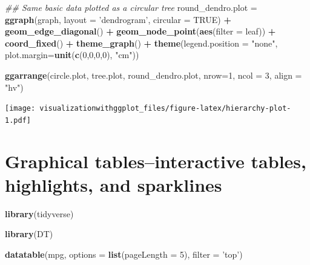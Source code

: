 \documentclass[]{krantz}
\makeatletter
\newenvironment{Shaded}{\begin{snugshade}}{\end{snugshade}}
\newcommand{\CommentTok}[1]{\textcolor[rgb]{0.56,0.35,0.01}{\textit{#1}}}
\newcommand{\DataTypeTok}[1]{\textcolor[rgb]{0.13,0.29,0.53}{#1}}
\newcommand{\DecValTok}[1]{\textcolor[rgb]{0.00,0.00,0.81}{#1}}
\newcommand{\KeywordTok}[1]{\textcolor[rgb]{0.13,0.29,0.53}{\textbf{#1}}}
\newcommand{\NormalTok}[1]{#1}
\newcommand{\OperatorTok}[1]{\textcolor[rgb]{0.81,0.36,0.00}{\textbf{#1}}}
\newcommand{\OtherTok}[1]{\textcolor[rgb]{0.56,0.35,0.01}{#1}}
\newcommand{\StringTok}[1]{\textcolor[rgb]{0.31,0.60,0.02}{#1}}
\newenvironment{kframe}{%
\medskip{}
\setlength{\fboxsep}{.8em}
 \def\at@end@of@kframe{}%
 \ifinner\ifhmode%
  \def\at@end@of@kframe{\end{minipage}}%
  \begin{minipage}{\columnwidth}%
 \fi\fi%
 \def\FrameCommand##1{\hskip\@totalleftmargin \hskip-\fboxsep
 \colorbox{shadecolor}{##1}\hskip-\fboxsep
     \hskip-\linewidth \hskip-\@totalleftmargin \hskip\columnwidth}%
 \MakeFramed {\advance\hsize-\width
   \@totalleftmargin\z@ \linewidth\hsize
   \@setminipage}}%
 {\par\unskip\endMakeFramed%
 \at@end@of@kframe}
\renewenvironment{Shaded}{\begin{kframe}}{\end{kframe}}
\makeatother
\begin{document}
\begin{Shaded}
\begin{Highlighting}[]
\CommentTok{## Same basic data plotted as a circular tree}
\NormalTok{round_dendro.plot =}\StringTok{ }\KeywordTok{ggraph}\NormalTok{(graph, }\DataTypeTok{layout =} \StringTok{'dendrogram'}\NormalTok{, }\DataTypeTok{circular =} \OtherTok{TRUE}\NormalTok{) }\OperatorTok{+}\StringTok{ }
\StringTok{    }\KeywordTok{geom_edge_diagonal}\NormalTok{() }\OperatorTok{+}\StringTok{ }
\StringTok{    }\KeywordTok{geom_node_point}\NormalTok{(}\KeywordTok{aes}\NormalTok{(}\DataTypeTok{filter =}\NormalTok{ leaf)) }\OperatorTok{+}\StringTok{ }
\StringTok{    }\KeywordTok{coord_fixed}\NormalTok{() }\OperatorTok{+}
\StringTok{    }\KeywordTok{theme_graph}\NormalTok{() }\OperatorTok{+}\StringTok{ }
\StringTok{  }\KeywordTok{theme}\NormalTok{(}\DataTypeTok{legend.position =} \StringTok{"none"}\NormalTok{, }\DataTypeTok{plot.margin=}\KeywordTok{unit}\NormalTok{(}\KeywordTok{c}\NormalTok{(}\DecValTok{0}\NormalTok{,}\DecValTok{0}\NormalTok{,}\DecValTok{0}\NormalTok{,}\DecValTok{0}\NormalTok{), }\StringTok{"cm"}\NormalTok{))}


\KeywordTok{ggarrange}\NormalTok{(circle.plot, tree.plot, round_dendro.plot,}
\DataTypeTok{nrow=}\DecValTok{1}\NormalTok{, }\DataTypeTok{ncol =} \DecValTok{3}\NormalTok{, }\DataTypeTok{align =} \StringTok{"hv"}\NormalTok{)}
\end{Highlighting}
\end{Shaded}

\texttt{[image: visualizationwithggplot\_files/figure-latex/hierarchy-plot-1.pdf]}

\cleardoublepage

\hypertarget{Tables}{%
\chapter{Graphical tables--interactive tables, highlights, and sparklines}\label{Tables}}

\begin{Shaded}
\begin{Highlighting}[]
\KeywordTok{library}\NormalTok{(tidyverse)}
\end{Highlighting}
\end{Shaded}

\begin{Shaded}
\begin{Highlighting}[]
\KeywordTok{library}\NormalTok{(DT)}

\KeywordTok{datatable}\NormalTok{(mpg, }\DataTypeTok{options =} \KeywordTok{list}\NormalTok{(}\DataTypeTok{pageLength =} \DecValTok{5}\NormalTok{), }\DataTypeTok{filter =} \StringTok{'top'}\NormalTok{)}
\end{Highlighting}
\end{Shaded}
\end{document}
